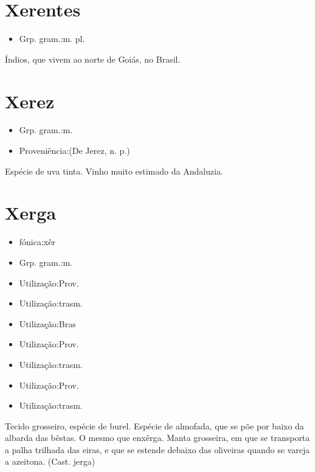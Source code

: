 \section{Xerentes}
\begin{itemize}
\item {Grp. gram.:m. pl.}
\end{itemize}
Índios, que vivem ao norte de Goiás, no Brasil.
\section{Xerez}
\begin{itemize}
\item {Grp. gram.:m.}
\end{itemize}
\begin{itemize}
\item {Proveniência:(De \textunderscore Jerez\textunderscore , n. p.)}
\end{itemize}
Espécie de uva tinta.
Vinho muito estimado da Andaluzia.
\section{Xerga}
\begin{itemize}
\item {fónica:xêr}
\end{itemize}
\begin{itemize}
\item {Grp. gram.:m.}
\end{itemize}
\begin{itemize}
\item {Utilização:Prov.}
\end{itemize}
\begin{itemize}
\item {Utilização:trasm.}
\end{itemize}
\begin{itemize}
\item {Utilização:Bras}
\end{itemize}
\begin{itemize}
\item {Utilização:Prov.}
\end{itemize}
\begin{itemize}
\item {Utilização:trasm.}
\end{itemize}
\begin{itemize}
\item {Utilização:Prov.}
\end{itemize}
\begin{itemize}
\item {Utilização:trasm.}
\end{itemize}
Tecido grosseiro, espécie de burel.
Espécie de almofada, que se põe por baixo da albarda das bêstas.
O mesmo que \textunderscore enxêrga\textunderscore .
Manta grosseira, em que se transporta a palha trilhada das eiras, e que se estende debaixo das oliveiras quando se vareja a azeitona.
(Cast. \textunderscore jerga\textunderscore )

